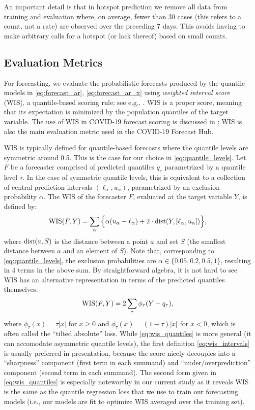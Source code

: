 \documentclass[9pt,twocolumn,twoside,lineno]{pnas-new}
\begin{document}
An important detail is that in hotspot prediction we remove all data from
training and evaluation where, on average, fewer than 30 cases (this refers to a
count, not a rate) are observed over the preceding 7 days. This avoids having to
make arbitrary calls for a hotspot (or lack thereof) based on small counts.   

\subsection{Evaluation Metrics}

For forecasting, we evaluate the probabilistic forecasts produced by the
quantile models in \eqref{eq:forecast_ar}, \eqref{eq:forecast_ar_x} using 
\textit{weighted interval score} (WIS), a quantile-based scoring rule; see e.g.,
\cite{Gneiting:2007}.  WIS is a proper score, meaning that its expectation
is minimized by the population quantiles of the target variable.  The use of WIS
in COVID-19 forecast scoring is discussed in \cite{Bracher:2021}; WIS is also
the main evaluation metric used in the COVID-19 Forecast Hub.   

WIS is typically defined for quantile-based forecasts where the quantile levels
are symmetric around 0.5.  This is the case for our choice in
\eqref{eq:quantile_levels}.  Let $F$ be a forecaster comprised of predicted
quantiles $q_\tau$ parametrized by a quantile level $\tau$.  In the case of
symmetric quantile levels, this is equivalent to a collection of central
prediction intervals $(\ell_\alpha, u_\alpha)$, parametrized by an exclusion
probability $\alpha$. The WIS of the forecaster $F$, evaluated at the target
variable $Y$, is defined by:
\begin{equation}
\label{eq:wis_intervals}
\mathrm{WIS}(F,Y) = \sum_\alpha \Big\{\alpha(u_\alpha - \ell_\alpha) + 2 \cdot
\mathrm{dist}(Y, [\ell_\alpha, u_\alpha])\Big\},  
\end{equation}
where $\mathrm{dist}(a, S)$ is the distance between a point $a$ and set $S$ (the
smallest distance between $a$ and an element of $S$).  Note that, corresponding 
to \eqref{eq:quantile_levels}, the exclusion probabilities are $\alpha \in
\{0.05, 0.2, 0.5, 1\}$, resulting in 4 terms in the above sum.  By 
straightforward algebra, it is not hard to see WIS has an alternative 
representation in terms of the predicted quantiles themselves:
\begin{equation}
\label{eq:wis_quantiles}
\mathrm{WIS}(F,Y) = 2 \sum_\tau \phi_\tau(Y - q_\tau), 
\end{equation}
where $\phi_\tau(x) = \tau |x|$ for $x \geq 0$ and $\phi_\tau(x) = (1-\tau)
|x|$ for $x<0$, which is often called the ``tilted absolute'' loss.  While
\eqref{eq:wis_quantiles} is more general (it can accomodate asymmetric quantile
levels), the first definition \eqref{eq:wis_intervals} is usually preferred in
presentation, because the score nicely decouples into a ``sharpness'' component
(first term in each summand) and ``under/overprediction'' component (second term
in each summand).  The second form given in \eqref{eq:wis_quantiles} is
especially noteworthy in our current study as it reveals WIS is the same as the
quantile regression loss that we use to train our forecasting models (i.e., our
models are fit to optimize WIS averaged over the training set).    
\end{document}
